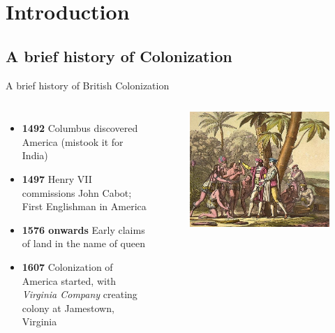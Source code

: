 \documentclass{beamer}
\begin{document}
\section{Introduction}
\subsection{A brief history of Colonization}
\begin{frame}{A brief history of British Colonization}
  \begin{columns}[c]
  \begin{itemize}
  \item \textbf{1492} Columbus discovered America (mistook it for India)
  \item \textbf{1497} Henry VII commissions John Cabot; First Englishman in America
  \item \textbf{1576 onwards} Early claims of land in the name of queen
  \item \textbf{1607} Colonization of America started, with \emph{Virginia Company} creating colony at Jamestown, Virginia
  \end{itemize}
    \begin{figure}[htp]
      \begin{center}
        \centering
        \includegraphics[scale=0.29]{../Presentation/columbus.jpg}
      \end{center}
    \end{figure}
    \end{columns}
\end{frame}
\end{document}
